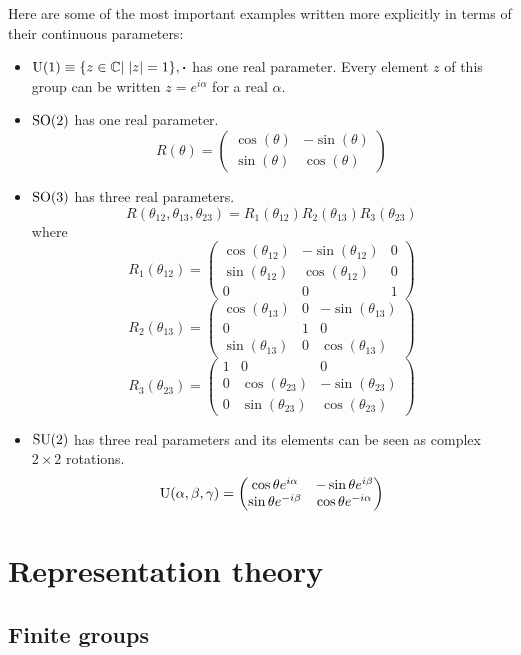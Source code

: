 Here are some of the most important examples written more explicitly in terms of their continuous parameters:
\begin{itemize}
\item $\operatorname{U}(1) \equiv \{z\in\mathbb{C}|\; |z|=1\}, \boldsymbol{\cdot}$ has one real parameter. Every element $z$ of this group can be written $z=e^{i\alpha}$ for a real $\alpha$.
\item $\operatorname{SO}(2)$ has one real parameter.
\[ R(\theta) = \begin{pmatrix}\cos(\theta) & -\sin(\theta)\\ \sin(\theta) & \cos(\theta)\end{pmatrix} \]
\item $\operatorname{SO}(3)$ has three real parameters.
\[ R(\theta_{12},\theta_{13},\theta_{23}) = R_1(\theta_{12})R_2(\theta_{13})R_3(\theta_{23}) \]
where
\[R_1(\theta_{12}) = \begin{pmatrix}\cos(\theta_{12}) & -\sin(\theta_{12})&0\\ \sin(\theta_{12}) & \cos(\theta_{12})&0\\0&0&1\end{pmatrix}\]
\[R_2(\theta_{13}) = \begin{pmatrix}\cos(\theta_{13}) &0& -\sin(\theta_{13})\\0&1&0\\ \sin(\theta_{13}) &0& \cos(\theta_{13})\end{pmatrix}\]
\[R_3(\theta_{23}) = \begin{pmatrix}1&0&0\\ 0&\cos(\theta_{23}) & -\sin(\theta_{23})\\0& \sin(\theta_{23}) & \cos(\theta_{23})\end{pmatrix}\]
\item $\operatorname{SU}(2)$ has three real parameters and its elements can be seen as complex $2\times 2$ rotations.
\[ \operatorname{U}(\alpha, \beta, \gamma) = \begin{pmatrix}\cos\theta e^{i\alpha} & -\sin\theta e^{i\beta}\\ \sin\theta e^{-i\beta} & \cos\theta e^{-i\alpha}\end{pmatrix} \]
\end{itemize}


\chapter{Representation theory}
\section{Finite groups}
